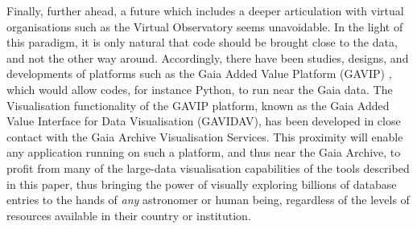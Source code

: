 \documentclass[longauth, final]{aa}
\begin{document}
Finally, further ahead, a future which includes a deeper articulation with virtual organisations such as the Virtual Observatory seems unavoidable. In the light of this paradigm, it is only  natural that code should be brought close to the data, and not the other way around. Accordingly, there have been studies, designs, and developments of platforms such as the  Gaia Added Value Platform (GAVIP) \citep{GAVIP2016}, which would allow codes, for instance  Python, to run near the Gaia data. The Visualisation functionality of the GAVIP platform, known as the Gaia Added Value Interface for Data Visualisation (GAVIDAV), has been developed in close contact with the Gaia Archive Visualisation Services. This proximity will enable any application running on such a platform, and thus near the Gaia Archive, to profit from many of the large-data visualisation capabilities of the tools described in this paper, thus bringing the power of visually exploring billions of database entries to the hands of {\it any} astronomer or human being, regardless of the levels of resources available in  their country or institution.
\end{document}
